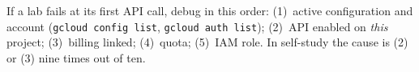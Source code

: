 \begin{notebox}
If a lab fails at its first API call, debug in this order: (1)~active configuration and account
(\texttt{gcloud config list}, \texttt{gcloud auth list}); (2)~API enabled on \emph{this} project;
(3)~billing linked; (4)~quota; (5)~IAM role. In self-study the cause is (2) or (3) nine times out
of ten.
\end{notebox}
